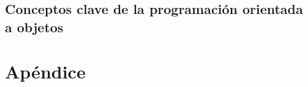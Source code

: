 \documentclass[11pt,a4paper]{article}
\begin{document}
\subsection{Conceptos clave de la programación orientada a objetos}

\newpage

\appendix
\section{Apéndice}
%
%
\end{document}
